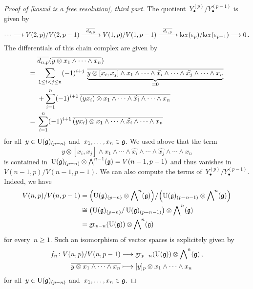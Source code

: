 \begin{proof}[Proof of \cref{koszul is a free resolution}, third part]
	The quotient~$Y^{(p)}_\bullet / Y^{(p-1)}_\bullet$ is given by
	\[
		\dotsb
		\to
		V(2,p) / V(2, p-1)
		\xto{\induced{d_{2,p}}}
		V(1,p) / V(1, p-1)
		\xto{\induced{d_{1,p}}}
		\ker(\varepsilon_p) / {\ker(\varepsilon_{p-1})}
		\to
		0 \,.
	\]
	The differentials of this chain complex are given by
	\begin{align*}
		{}&
		\overline{d_{n,p}}( \overline{y \otimes x_1 \wedge \dotsb \wedge x_n} )
		\\
		={}&
		\sum_{1 \leq i < j \leq n}
		(-1)^{i+j}
		\,
		\underbrace{
			\overline{
				y \otimes [x_i, x_j] \wedge x_1 \wedge \dotsb \wedge \widehat{x_i} \wedge \dotsb \wedge \widehat{x_j} \wedge \dotsb \wedge x_n
			}
		}_{=0}
		\\
		{}&
		+
		\sum_{i=1}^n
		(-1)^{i+1}
		\,
		\overline{ (y x_i) \otimes x_1 \wedge \dotsb \wedge \widehat{x_i} \wedge \dotsb \wedge x_n }
		\\
		={}&
		\sum_{i=1}^n
		(-1)^{i+1}
		\,
		\overline{ (y x_i) \otimes x_1 \wedge \dotsb \wedge \widehat{x_i} \wedge \dotsb \wedge x_n }
	\end{align*}
	for all~$y \in \operatorname{U}(\mathfrak{g})_{(p-n)}$ and~$x_1, \dotsc, x_n \in \mathfrak{g}$.
	We used above that the term
	\[
		y \otimes [x_i,x_j] \wedge x_1 \wedge \dotsb \wedge \widehat{x_i} \wedge \dotsb \wedge \widehat{x_j} \wedge \dotsb \wedge x_n
	\]
	is contained in~$\operatorname{U}(\mathfrak{g})_{(p-n)} \otimes \operatorname{\bigwedge}^{n-1}(\mathfrak{g}) = V(n-1,p-1)$ and thus vanishes in~$V(n-1,p) / V(n-1, p-1)$.
	We can also compute the terms of~$Y^{(p)}_\bullet / Y^{(p-1)}_\bullet$.
	Indeed, we have
	\begin{align*}
		V(n, p) / V(n, p-1)
		&=
		\Bigl(
			\Univ(\glie)_{(p-n)} \otimes \Exterior^n(\glie)
		\Bigr)
		\big/
		\Bigl(
			\Univ(\glie)_{(p-n-1)} \otimes \Exterior^n(\glie)
		\Bigr)
		\\
		&\cong
		\bigl(
			\Univ(\glie)_{(p-n)} / \Univ(\glie)_{(p-n-1)}
		\bigr)
		\otimes
		\Exterior^n(\glie)
		\\
		&=
		\gr[p-n]( \Univ(\glie) )
		\otimes
		\Exterior^n(\glie)
	\end{align*}
	for every~$n \geq 1$.
	Such an isomorphism of vector spaces is explicitely given by
	\begin{align*}
		f_n
		\colon
		V(n, p) / V(n, p-1)
		&\to
		\gr[p-n]( \Univ(\glie) )
		\otimes
		\Exterior^n(\glie) \,,
		\\
		\class{ y \otimes x_1 \wedge \dotsb \wedge x_n }
		&\mapsto
		\fclass{ y }_p \otimes x_1 \wedge \dotsb \wedge x_n
	\end{align*}
	for all~$y \in \operatorname{U}(\mathfrak{g})_{(p-n)}$ and~$x_1, \dotsc, x_n \in \mathfrak{g}$.

\end{proof}
